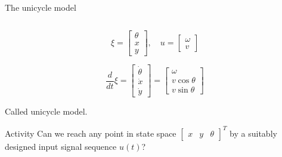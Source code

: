 \documentclass[presentation,aspectratio=169]{beamer}
\begin{document}
\begin{frame}[label={sec:org381172e}]{The unicycle model}
\begin{columns}
\begin{column}{0.6\columnwidth}
\pause

\[ \xi = \begin{bmatrix} \theta\\x\\y \end{bmatrix},   \quad u = \begin{bmatrix} \omega\\v \end{bmatrix}\]



\[\frac{d}{dt} \xi = \begin{bmatrix} \dot{\theta}\\\dot{x}\\\dot{y} \end{bmatrix} = \begin{bmatrix} \omega\\ v\cos\theta\\v\sin\theta\end{bmatrix} \]

Called unicycle model.
\pause

\alert{Activity} Can we reach any point in state space \(\begin{bmatrix} x &  y & \theta \end{bmatrix}^T\) by a suitably designed input signal sequence \(u(t)\)?
\end{column}
\end{columns}
\end{frame}
\end{document}
